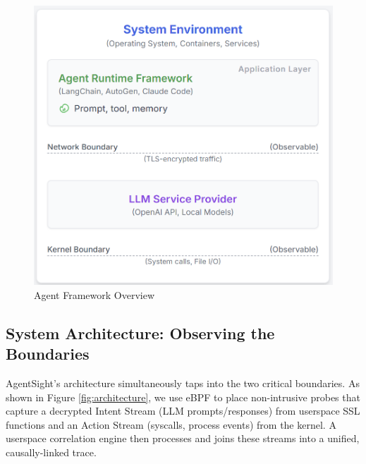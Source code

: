 \begin{figure}[h!]
    \centering
    \includegraphics[width=\columnwidth]{figture/agent.png}
    \caption{Agent Framework Overview}
    \label{fig:agent}
\end{figure}

\subsection{System Architecture: Observing the Boundaries}

AgentSight's architecture simultaneously taps into the two critical boundaries. As shown in Figure \ref{fig:architecture}, we use eBPF to place non-intrusive probes that capture a decrypted Intent Stream (LLM prompts/responses) from userspace SSL functions and an Action Stream (syscalls, process events) from the kernel. A userspace correlation engine then processes and joins these streams into a unified, causally-linked trace.

